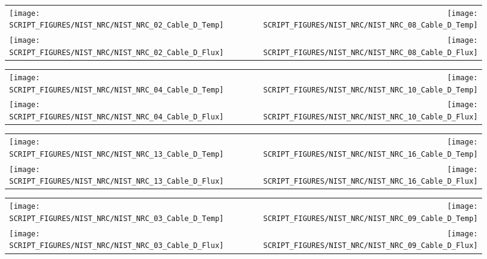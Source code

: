 \begin{figure}[!ht]
\begin{tabular*}{\textwidth}{l@{\extracolsep{\fill}}r}
\texttt{[image: SCRIPT\_FIGURES/NIST\_NRC/NIST\_NRC\_02\_Cable\_D\_Temp]} &
\texttt{[image: SCRIPT\_FIGURES/NIST\_NRC/NIST\_NRC\_08\_Cable\_D\_Temp]} \\
\texttt{[image: SCRIPT\_FIGURES/NIST\_NRC/NIST\_NRC\_02\_Cable\_D\_Flux]} &
\texttt{[image: SCRIPT\_FIGURES/NIST\_NRC/NIST\_NRC\_08\_Cable\_D\_Flux]}
\end{tabular*}
\label{NIST_NRC_D_2_and_8}
\end{figure}

\clearpage

\begin{figure}[!ht]
\begin{tabular*}{\textwidth}{l@{\extracolsep{\fill}}r}
\texttt{[image: SCRIPT\_FIGURES/NIST\_NRC/NIST\_NRC\_04\_Cable\_D\_Temp]} &
\texttt{[image: SCRIPT\_FIGURES/NIST\_NRC/NIST\_NRC\_10\_Cable\_D\_Temp]} \\
\texttt{[image: SCRIPT\_FIGURES/NIST\_NRC/NIST\_NRC\_04\_Cable\_D\_Flux]} &
\texttt{[image: SCRIPT\_FIGURES/NIST\_NRC/NIST\_NRC\_10\_Cable\_D\_Flux]}
\end{tabular*}
\label{NIST_NRC_D_4_and_10}
\end{figure}

\begin{figure}[!ht]
\begin{tabular*}{\textwidth}{l@{\extracolsep{\fill}}r}
\texttt{[image: SCRIPT\_FIGURES/NIST\_NRC/NIST\_NRC\_13\_Cable\_D\_Temp]} &
\texttt{[image: SCRIPT\_FIGURES/NIST\_NRC/NIST\_NRC\_16\_Cable\_D\_Temp]} \\
\texttt{[image: SCRIPT\_FIGURES/NIST\_NRC/NIST\_NRC\_13\_Cable\_D\_Flux]} &
\texttt{[image: SCRIPT\_FIGURES/NIST\_NRC/NIST\_NRC\_16\_Cable\_D\_Flux]}
\end{tabular*}
\label{NIST_NRC_D_13_and_16}
\end{figure}

\clearpage

\begin{figure}[!ht]
\begin{tabular*}{\textwidth}{l@{\extracolsep{\fill}}r}
\texttt{[image: SCRIPT\_FIGURES/NIST\_NRC/NIST\_NRC\_03\_Cable\_D\_Temp]} &
\texttt{[image: SCRIPT\_FIGURES/NIST\_NRC/NIST\_NRC\_09\_Cable\_D\_Temp]} \\
\texttt{[image: SCRIPT\_FIGURES/NIST\_NRC/NIST\_NRC\_03\_Cable\_D\_Flux]} &
\texttt{[image: SCRIPT\_FIGURES/NIST\_NRC/NIST\_NRC\_09\_Cable\_D\_Flux]}
\end{tabular*}
\label{NIST_NRC_D_3_and_9}
\end{figure}

